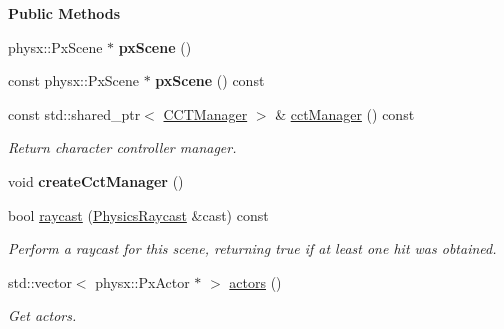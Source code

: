 \begin{Indent}\textbf{ Public Methods}\par
\begin{DoxyCompactItemize}
\item 
\mbox{\label{classrev_1_1_physics_scene_a1cb7f4fb4ed653d94d9fa7a5c79ce6de}} 
physx\+::\+Px\+Scene $\ast$ {\bfseries px\+Scene} ()
\item 
\mbox{\label{classrev_1_1_physics_scene_a4e02fbabd0a5733db4eabd607dda9ed4}} 
const physx\+::\+Px\+Scene $\ast$ {\bfseries px\+Scene} () const
\item 
\mbox{\label{classrev_1_1_physics_scene_a88e3b98d0b922cf1acfc9a9a28b57abd}} 
const std\+::shared\+\_\+ptr$<$ \mbox{\hyperlink{classrev_1_1_c_c_t_manager}{C\+C\+T\+Manager}} $>$ \& \mbox{\hyperlink{classrev_1_1_physics_scene_a88e3b98d0b922cf1acfc9a9a28b57abd}{cct\+Manager}} () const
\begin{DoxyCompactList}\small\item\em Return character controller manager. \end{DoxyCompactList}\item 
\mbox{\label{classrev_1_1_physics_scene_a5477c555e20a63d7b0dc6496c0fa4ea1}} 
void {\bfseries create\+Cct\+Manager} ()
\item 
\mbox{\label{classrev_1_1_physics_scene_a95a1eacb09e601d5b23173abb09ba1a5}} 
bool \mbox{\hyperlink{classrev_1_1_physics_scene_a95a1eacb09e601d5b23173abb09ba1a5}{raycast}} (\mbox{\hyperlink{classrev_1_1_physics_raycast}{Physics\+Raycast}} \&cast) const
\begin{DoxyCompactList}\small\item\em Perform a raycast for this scene, returning true if at least one hit was obtained. \end{DoxyCompactList}\item 
\mbox{\label{classrev_1_1_physics_scene_a852a127982ff857ae8153e0f3f19b435}} 
std\+::vector$<$ physx\+::\+Px\+Actor $\ast$ $>$ \mbox{\hyperlink{classrev_1_1_physics_scene_a852a127982ff857ae8153e0f3f19b435}{actors}} ()
\begin{DoxyCompactList}\small\item\em Get actors. \end{DoxyCompactList}\item 

\end{DoxyCompactItemize}
\end{Indent}
